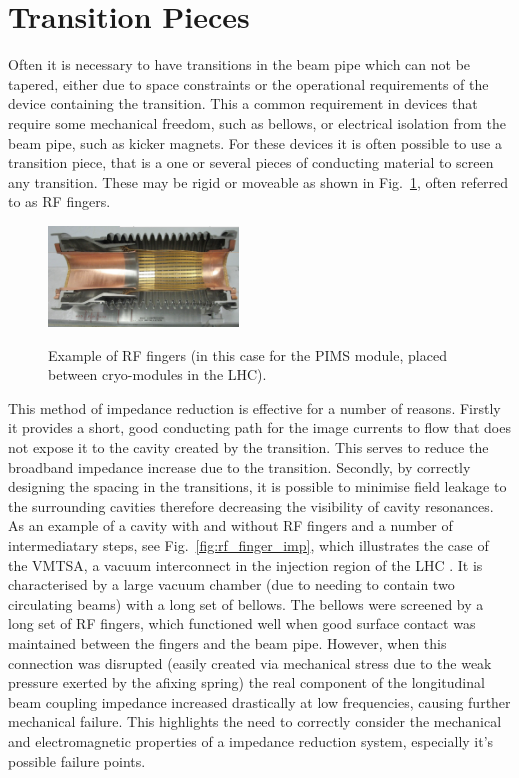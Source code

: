 \section{Transition Pieces}
\label{sec:transitions}

Often it is necessary to have transitions in the beam pipe which can not be tapered, either due to space constraints or the operational requirements of the device containing the transition. This a common requirement in devices that require some mechanical freedom, such as bellows, or electrical isolation from the beam pipe, such as kicker magnets. For these devices it is often possible to use a transition piece, that is a one or several pieces of conducting material to screen any transition. These may be rigid or moveable as shown in Fig.~\ref{fig:rf_fingers}, often referred to as RF fingers.

\begin{figure}
\begin{center}
\includegraphics[width=0.45\textwidth]{Beam_Coupling_Impedance_Reduction_Techniques/figures/pimsImage.png}
\label{fig:rf_fingers}
\end{center}
\caption{Example of RF fingers (in this case for the PIMS module, placed between cryo-modules in the LHC).}
\end{figure}


This method of impedance reduction is effective for a number of reasons. Firstly it provides a short, good conducting path for the image currents to flow that does not expose it to the cavity created by the transition. This serves to reduce the broadband impedance increase due to the transition. Secondly, by correctly designing the spacing in the transitions, it is possible to minimise field leakage to the surrounding cavities therefore decreasing the visibility of cavity resonances. As an example of a cavity with and without RF fingers and a number of intermediatary steps, see Fig.~\ref{fig:rf_finger_imp}, which illustrates the case of the VMTSA, a vacuum interconnect in the injection region of the LHC \cite{Salvant:VMTSA}. It is characterised by a large vacuum chamber (due to needing to contain two circulating beams) with a long set of bellows. The bellows were screened by a long set of RF fingers, which functioned well when good surface contact was maintained between the fingers and the beam pipe. However, when this connection was disrupted (easily created via mechanical stress due to the weak pressure exerted by the afixing spring) the real component of the longitudinal beam coupling impedance increased drastically at low frequencies, causing further mechanical failure. This highlights the need to correctly consider the mechanical and electromagnetic properties of a impedance reduction system, especially it's possible failure points.



